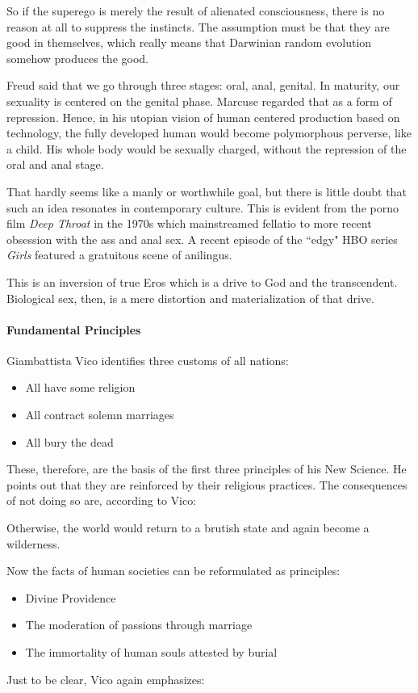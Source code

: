 So if the superego is merely the result of alienated consciousness, there is no reason at all to suppress the instincts. The assumption must be that they are good in themselves, which really means that Darwinian random evolution somehow produces the good.

Freud said that we go through three stages: oral, anal, genital. In maturity, our sexuality is centered on the genital phase. Marcuse regarded that as a form of repression. Hence, in his utopian vision of human centered production based on technology, the fully developed human would become polymorphous perverse, like a child. His whole body would be sexually charged, without the repression of the oral and anal stage.

That hardly seems like a manly or worthwhile goal, but there is little doubt that such an idea resonates in contemporary culture. This is evident from the porno film \emph{Deep Throat} in the 1970s which mainstreamed fellatio to more recent obsession with the ass and anal sex. A recent episode of the ``edgy" HBO series \emph{Girls} featured a gratuitous scene of anilingus.

This is an inversion of true Eros which is a drive to God and the transcendent. Biological sex, then, is a mere distortion and materialization of that drive.

\paragraph{Fundamental Principles}
Giambattista Vico identifies three customs of all nations:

\begin{itemize}
\item All have some religion 
\item All contract solemn marriages 
\item All bury the dead 
\end{itemize}
These, therefore, are the basis of the first three principles of his New Science. He points out that they are reinforced by their religious practices. The consequences of not doing so are, according to Vico:

\begin{quotex}
Otherwise, the world would return to a brutish state and again become a wilderness. 

\end{quotex}
Now the facts of human societies can be reformulated as principles:

\begin{itemize}
\item Divine Providence 
\item The moderation of passions through marriage 
\item The immortality of human souls attested by burial 
\end{itemize}
Just to be clear, Vico again emphasizes:

